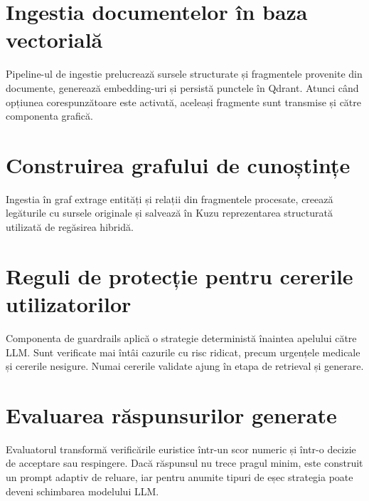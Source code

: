 \documentclass[12pt, a4paper, oneside, romanian]{teza-upb}
\begin{document}
\label{anexa:retrieval-dispatch}


\section{Ingestia documentelor în baza vectorială}

Pipeline-ul de ingestie prelucrează sursele structurate și fragmentele provenite din documente, generează embedding-uri și persistă punctele în Qdrant. Atunci când opțiunea corespunzătoare este activată, aceleași fragmente sunt transmise și către componenta grafică.

\label{anexa:qdrant-ingestion-pipeline}


\section{Construirea grafului de cunoștințe}

Ingestia în graf extrage entități și relații din fragmentele procesate, creează legăturile cu sursele originale și salvează în Kuzu reprezentarea structurată utilizată de regăsirea hibridă.

\label{anexa:graph-ingestion}


\section{Reguli de protecție pentru cererile utilizatorilor}

Componenta de guardrails aplică o strategie deterministă înaintea apelului către LLM. Sunt verificate mai întâi cazurile cu risc ridicat, precum urgențele medicale și cererile nesigure. Numai cererile validate ajung în etapa de retrieval și generare.

\label{anexa:guardrail-rules}


\section{Evaluarea răspunsurilor generate}

Evaluatorul transformă verificările euristice într-un scor numeric și într-o decizie de acceptare sau respingere. Dacă răspunsul nu trece pragul minim, este construit un prompt adaptiv de reluare, iar pentru anumite tipuri de eșec strategia poate deveni schimbarea modelului LLM.
\end{document}
